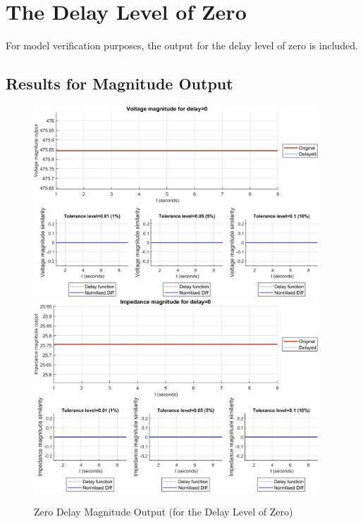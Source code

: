 \section{The Delay Level of Zero}
For model verification purposes, the output for the delay level of zero is included.
\subsection{Results for Magnitude Output}
\begin{figure}
    \includegraphics[width=0.95\textwidth]{PMUsim-figures/DelayOf_0/Zero_vMagnitude.png}    
    \label{fig:PMUsim_Zero_vMagnitude}
    \includegraphics[width=0.95\textwidth]{PMUsim-figures/DelayOf_0/Zero_iMagnitude.png}    
    \caption{Zero Delay Magnitude Output (for the Delay Level of Zero)}
    \label{fig:PMUsim_Zero_Magnitude}
\begin{small}
\end{small}
\end{figure}
